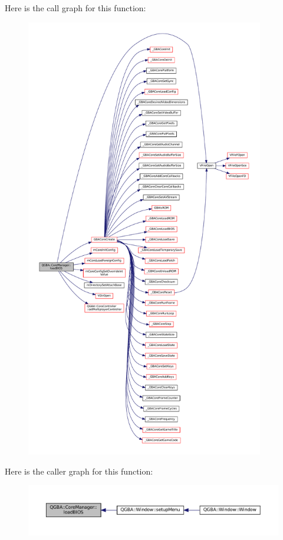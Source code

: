 Here is the call graph for this function\+:
\nopagebreak
\begin{figure}[H]
\begin{center}
\leavevmode
\includegraphics[height=550pt]{class_q_g_b_a_1_1_core_manager_a84ddcb6a08e2961de873654fed736470_cgraph}
\end{center}
\end{figure}
Here is the caller graph for this function\+:
\nopagebreak
\begin{figure}[H]
\begin{center}
\leavevmode
\includegraphics[width=350pt]{class_q_g_b_a_1_1_core_manager_a84ddcb6a08e2961de873654fed736470_icgraph}
\end{center}
\end{figure}
\mbox{\label{class_q_g_b_a_1_1_core_manager_af12570d46c37a8f68d574767a7e80350}} 
